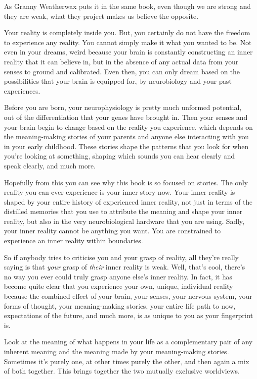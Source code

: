 As Granny Weatherwax puts it in the same book, even though we are strong and they are weak, what they project makes us believe the opposite.


Your reality is completely inside you. But, you certainly do not have the freedom to experience any reality. You cannot simply make it what you wanted to be. Not even in your dreams, weird because your brain is constantly constructing an inner reality that it can believe in, but in the absence of any actual data from your senses to ground and calibrated. Even then, you can only dream based on the possibilities that your brain is equipped for, by neurobiology and your past experiences.


Before you are born, your neurophysiology is pretty much unformed potential, out of the differentiation that your genes have brought in. Then your senses and your brain begin to change based on the reality you experience, which depends on the meaning-making stories of your parents and anyone else interacting with you in your early childhood. These stories shape the patterns that you look for when you're looking at something, shaping which sounds you can hear clearly and speak clearly, and much more.


Hopefully from this you can see why this book is so focused on stories. The only reality you can ever experience is your inner story now. Your inner reality is shaped by your entire history of experienced inner reality, not just in terms of the distilled memories that you use to attribute the meaning and shape your inner reality, but also in the very neurobiological hardware that you are using. Sadly, your inner reality cannot be anything you want. You are constrained to experience an inner reality within boundaries.


So if anybody tries to criticise you and your grasp of reality, all they're really saying is that \emph{your} grasp of \emph{their} inner reality is weak. Well, that's cool, there's no way you ever could truly grasp anyone else's inner reality. In fact, it has become quite clear that you experience your own, unique, individual reality because the combined effect of your brain, your senses, your nervous system, your forms of thought, your meaning-making stories, your entire life path to now, expectations of the future, and much more, is as unique to you as your fingerprint is\cite{sci-am-reality}. 


Look at the meaning of what happens in your life as a complementary pair of any inherent meaning and the meaning made by your meaning-making stories. Sometimes it's purely one, at other times purely the other, and then again a mix of both together. This brings together the two mutually exclusive worldviews\cite{chapman-meaningness-eternalism-nihilism}. 


